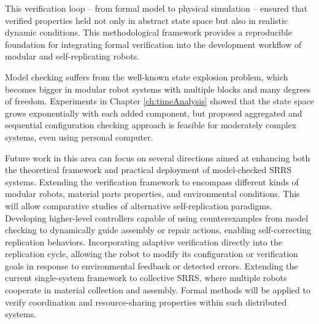 This verification loop -- from formal model to physical simulation --
ensured that verified properties held not only in abstract state space 
but also in realistic dynamic conditions.
This methodological framework provides a reproducible foundation for 
integrating formal verification into the development workflow of modular 
and self-replicating robots.

Model checking suffers from the well-known state explosion problem, 
which becomes bigger in modular robot systems with multiple blocks and 
many degrees of freedom.
Experiments in Chapter \ref{ch:timeAnalysis} showed that the state 
space grows exponentially with each 
added component, but proposed aggregated and sequential configuration checking 
 approach is feasible for moderately 
complex systems, even using personal computer.

%
%

Future work in this area can focus on several directions aimed at enhancing both 
the theoretical framework and practical deployment of model-checked SRRS 
systems.
Extending the verification framework to encompass different kinds of 
modular robots, material parts properties, and environmental conditions.
This will allow comparative studies of alternative self-replication paradigms.
Developing higher-level controllers capable of using counterexamples from 
model checking to dynamically guide assembly or repair actions, enabling 
self-correcting replication behaviors.
Incorporating adaptive verification directly into the replication cycle,
allowing the robot to modify its configuration or verification goals 
in response to environmental feedback or detected errors.
Extending the current single-system framework to collective SRRS, 
where multiple robots cooperate in material collection and assembly. 
Formal methods will be applied to verify coordination and 
resource-sharing properties within such distributed systems.


